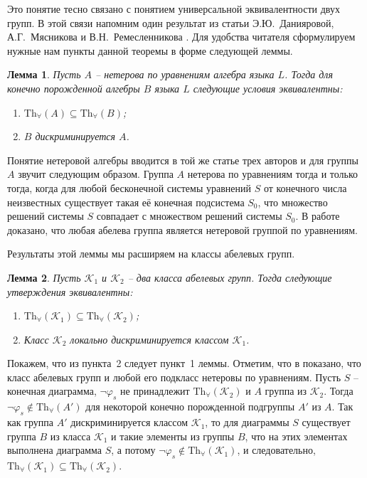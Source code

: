 \documentclass[a4paper,11pt,twoside]{article}
\newtheorem{lemma}{Лемма}[section]
\def\proof{{\noindent{\bf Доказательство.}} }
\def\K{{\mathcal{K}}}
\def\Tha{{\mathrm{Th}_\forall}}
\begin{document}
Это понятие тесно связано с понятием универсальной эквивалентности двух групп. В этой связи напомним один результат из статьи Э.Ю.~Данияровой, А.Г.~Мясникова и В.Н.~Ремесленникова \cite{DMR1}. Для удобства читателя сформулируем нужные нам пункты данной теоремы в форме следующей леммы.

\begin{lemma}\label{lemma:UnivEquiv}
Пусть $A$ -- нетерова по уравнениям алгебра языка $L$. Тогда для конечно порожденной алгебры $B$ языка $L$ следующие условия эквивалентны:
\begin{enumerate}
\item $\mathrm{Th}_{\forall}(A) \subseteq \mathrm{Th}_{\forall}(B)$;
\item $B$ дискриминируется $A$.
\end{enumerate}
\end{lemma}

Понятие нетеровой алгебры вводится в той же статье трех авторов и для группы $A$ звучит следующим образом. Группа $A$ нетерова по уравнениям тогда и только тогда, когда для любой бесконечной системы уравнений $S$ от конечного числа неизвестных существует такая её конечная подсистема $S_0$, что множество решений системы $S$ совпадает с множеством решений системы $S_0$. В работе \cite{DMR2} доказано, что любая абелева группа является нетеровой группой по уравнениям.

Результаты этой леммы мы расширяем на классы абелевых групп.

\begin{lemma}\label{lemma:UnivEquivForClass}
Пусть $\K_1$ и $\K_2$ -- два класса абелевых групп. Тогда следующие утверждения эквивалентны:
\begin{enumerate}
\item $\Tha(\K_1) \subseteq \Tha(\K_2)$;
\item Класс $\K_2$ локально дискриминируется классом $\K_1$.
\end{enumerate}
\end{lemma}

\proof Покажем, что из пункта~2 следует пункт~1 леммы. Отметим, что в \cite{DMR2} показано, что класс абелевых групп и любой его подкласс нетеровы по уравнениям. Пусть $S$ -- конечная диаграмма, $\neg \varphi_s$ не принадлежит $\Tha(\K_2)$ и $A$ группа из $\K_2$. Тогда $\neg \varphi_s \notin \Tha(A')$ для некоторой конечно порожденной подгруппы $A'$ из $A$. Так как группа $A'$ дискриминируется классом $\K_1$, то для диаграммы $S$ существует группа $B$ из класса $\K_1$ и такие элементы из группы $B$, что на этих элементах выполнена диаграмма $S$, а потому $\neg \varphi_s \notin \Tha(\K_1)$, и следовательно, $\Tha(\K_1) \subseteq \Tha(\K_2)$.
\end{document}
